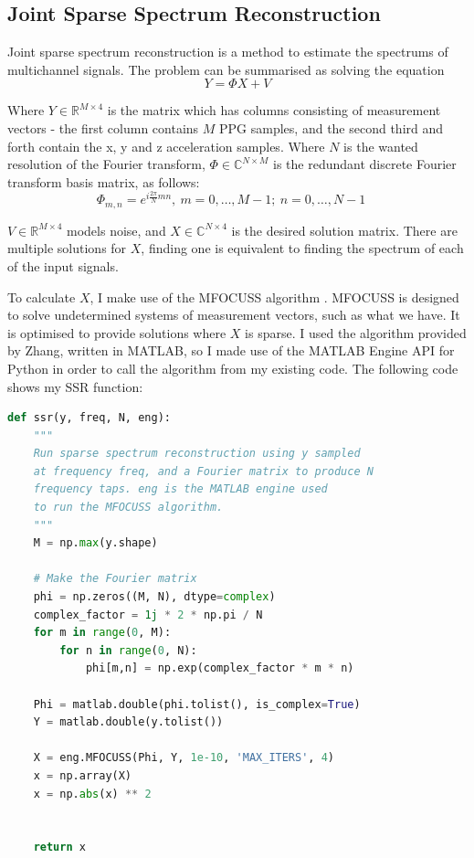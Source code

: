 \documentclass[12pt,a4paper,twoside,openright]{report}
\begin{document}
\subsection{Joint Sparse Spectrum Reconstruction}

Joint sparse spectrum reconstruction is a method to estimate the spectrums of
multichannel signals. The problem can be summarised as solving the equation 
$$ Y = \Phi X + V $$

Where $Y \in \mathbb{R}^{M \times 4}$ is the matrix which has columns consisting of measurement vectors -
the first column contains $M$ PPG samples, and the second third and forth contain
the x, y and z acceleration samples. Where $N$ is the wanted resolution of
the Fourier transform, $\Phi \in \mathbb{C}^{N \times M}$ is the redundant discrete Fourier
transform basis matrix, as follows:
$$ \Phi_{m,n} = e^{i \frac{2 \pi}{N}mn},\ m = 0,\ldots,M-1;\ n=0,\ldots,N-1
\quad $$

$V \in \mathbb{R} ^{M \times 4}$ models noise, and $X \in
\mathbb{C}^{N \times 4}$ is the desired solution matrix. There are multiple
solutions for $X$, finding one is equivalent to finding the spectrum of each
of the input signals.

To calculate $X$, I make use of the MFOCUSS algorithm \cite{Cotter05}.
MFOCUSS is designed to solve undetermined systems of measurement vectors, such
as what we have. It is optimised to provide solutions where $X$ is sparse.
I used the
algorithm provided by Zhang, written in MATLAB, so I made use of the MATLAB
Engine API for Python in order to call the algorithm from my existing code. The 
following code shows my SSR function:

\begin{lstlisting}[language=Python]
def ssr(y, freq, N, eng):
    """
    Run sparse spectrum reconstruction using y sampled 
    at frequency freq, and a Fourier matrix to produce N 
    frequency taps. eng is the MATLAB engine used
    to run the MFOCUSS algorithm.
    """
    M = np.max(y.shape)

    # Make the Fourier matrix
    phi = np.zeros((M, N), dtype=complex)
    complex_factor = 1j * 2 * np.pi / N 
    for m in range(0, M): 
        for n in range(0, N): 
            phi[m,n] = np.exp(complex_factor * m * n)

    Phi = matlab.double(phi.tolist(), is_complex=True)
    Y = matlab.double(y.tolist())

    X = eng.MFOCUSS(Phi, Y, 1e-10, 'MAX_ITERS', 4)
    x = np.array(X)
    x = np.abs(x) ** 2


    return x
\end{lstlisting}
\end{document}
